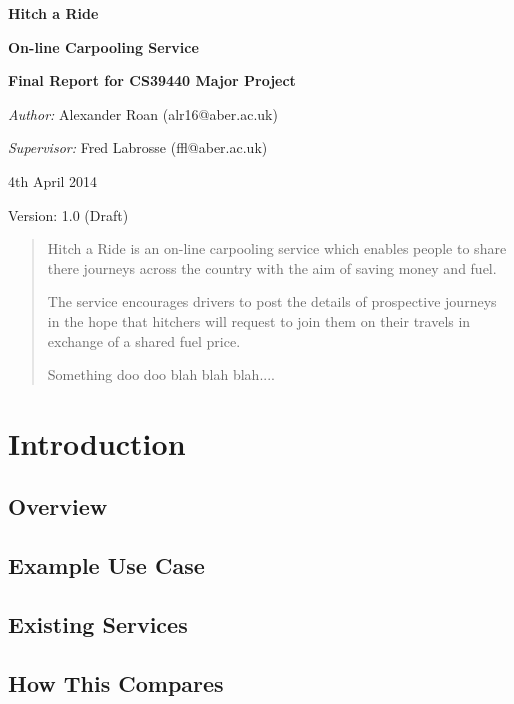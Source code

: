 \documentclass[11pt]{article}
\begin{document}
\begin{titlepage}
\begin{center}
	\vspace*{2cm}
	\Huge
	\textbf{Hitch a Ride}
	\vspace{0.5cm}
	
	\LARGE
	\textbf{On-line Carpooling Service}		
	\vspace{2cm}
	
	\Large
	\textbf{Final Report for CS39440 Major Project}	
	\vspace{0.5cm}
	
	\normalsize
	\textsl{Author: }Alexander Roan (alr16@aber.ac.uk)
	
	\textsl{Supervisor: }Fred Labrosse (ffl@aber.ac.uk)	
	\vspace{2cm}
	
	4th April 2014
	
	Version: 1.0 (Draft)	
\end{center}
\end{titlepage}

\begin{abstract}
Hitch a Ride is an on-line carpooling service which enables people to share there journeys across the country with the aim of saving money and fuel.

The service encourages drivers to post the details of prospective journeys in the hope that hitchers will request to join them on their travels in exchange of a shared fuel price. 

Something doo doo blah blah blah....

\end{abstract}

\newpage

\tableofcontents
\newpage
\section{Introduction}
	\subsection{Overview}
	\subsection{Example Use Case}
	\subsection{Existing Services}
	\subsection{How This Compares}
	
\end{document}
